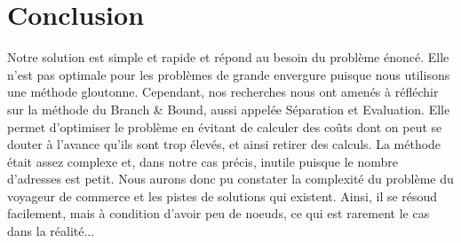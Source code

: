 
\section{Conclusion}
  Notre solution est simple et rapide et répond au besoin du problème énoncé. Elle n'est pas optimale pour les problèmes de grande envergure puisque nous utilisons une méthode gloutonne. Cependant, nos recherches nous ont amenés à réfléchir sur la méthode du Branch \& Bound, aussi appelée Séparation et Evaluation. Elle permet d'optimiser le problème en évitant de calculer des coûts dont on peut se douter à l'avance qu'ils sont trop élevés, et ainsi retirer des calculs. La méthode était assez complexe et, dans notre cas précis, inutile puisque le nombre d'adresses est petit.
  Nous aurons donc pu constater la complexité du problème du voyageur de commerce et les pistes de solutions qui existent. Ainsi, il se résoud facilement, mais à condition d'avoir peu de noeuds, ce qui est rarement le cas dans la réalité...
